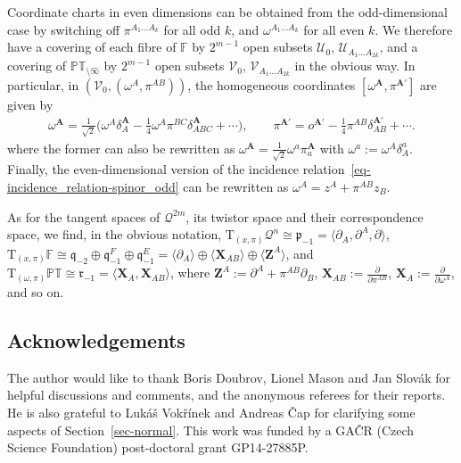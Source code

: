 \documentclass[10pt,a4paper]{amsart}
\numberwithin{equation}{section}
\newcommand{\parderv}[2] {\frac{\partial#1}{\partial#2}}
\newcommand{\mbf} [1]{\mathbf{#1}}
\newcommand{\mc} [1]{\mathcal{#1}}
\newcommand{\Tgt} {\mathrm{T}}
\newcommand{\mfp} {\mathfrak{p}}
\newcommand{\mfq} {\mathfrak{q}}
\newcommand{\mfr} {\mathfrak{r}}
\newcommand{\PT} {\mathbb{PT}}
\newcommand{\F} {\mathbb{F}}
\begin{document}
Coordinate charts in even dimensions can be obtained from the odd-dimensional case by switching of\/f $\pi^{A_1 \ldots A_{k}}$ for all odd $k$, and $\omega^{A_1 \ldots A_{k}}$ for all even $k$. We therefore have a covering of each f\/ibre of $\F$ by $2^{m-1}$ open subsets $\mc{U}_0$, $\mc{U}_{A_1 \ldots A_{2k}}$, and a covering of $\PT_{\setminus \widehat{\infty}}$ by $2^{m-1}$ open subsets $\mc{V}_0$, $\mc{V}_{A_1 \ldots A_{2k}}$ in the obvious way. In particular, in $(\mc{V}_0, (\omega^A , \pi^{AB} ))$, the homogeneous coordinates $[\omega^\mbf{A},\pi^{\mbf{A}'}]$ are given by
\begin{gather*}
\omega^\mbf{A} = \tfrac{1}{\sqrt{2}} \big( \omega^A \delta_A^\mbf{A} - \tfrac{1}{4} \omega^A \pi^{BC} \delta_{ABC}^\mbf{A} + \cdots \big) , \qquad
\pi^{\mbf{A}'} = o^{\mbf{A'}} - \tfrac{1}{4} \pi^{AB} \delta_{AB}^{\mbf{A'}} + \cdots .
\end{gather*}
where the former can also be rewritten as $\omega^\mbf{A} = \frac{1}{\sqrt{2}} \omega^a \pi_a^\mbf{A}$ with $\omega^a := \omega^A \delta_A^a$. Finally, the even-dimensional version of the incidence relation~\eqref{eq-incidence_relation-spinor_odd} can be rewritten as $\omega^A = z^A + \pi^{AB} z_B$.

As for the tangent spaces of $\mc{Q}^{2m}$, its twistor space and their correspondence space, we f\/ind, in the obvious notation, $\Tgt_{(x,\pi)} \mc{Q}^n \cong \mfp_{-1} = \langle \partial_{A} , \partial^{A} , \partial \rangle$, $\Tgt_{(x,\pi)} \F \cong \mfq_{-2} \oplus \mfq_{-1}^F \oplus \mfq_{-1}^E = \langle \partial_{A} \rangle \oplus \langle \bm{X}_{AB} \rangle \oplus \langle \bm{Z}^{A} \rangle$, and $\Tgt_{(\omega,\pi)} \PT \cong \mfr_{-1} = \langle \bm{X}_{A} , \bm{X}_{AB} \rangle$, where $\bm{Z} ^{A} := \partial ^{A} + \pi^{AB} \partial _B$, $\bm{X}_{AB} := \parderv{}{\pi^{AB}}$, $\bm{X}_{A} := \parderv{}{\omega^{A}}$, and so on.

\subsection*{Acknowledgements}
The author would like to thank Boris Doubrov, Lionel Mason and Jan Slov\'{a}k for helpful discussions and comments, and the anonymous referees for their reports. He is also grateful to Luk\'{a}\v{s} Vok\v{r}\'{i}nek and Andreas \v{C}ap for clarifying some aspects of Section~\ref{sec-normal}. This work was funded by a GA\v{C}R (Czech Science Foundation) post-doctoral grant GP14-27885P.

\end{document}
